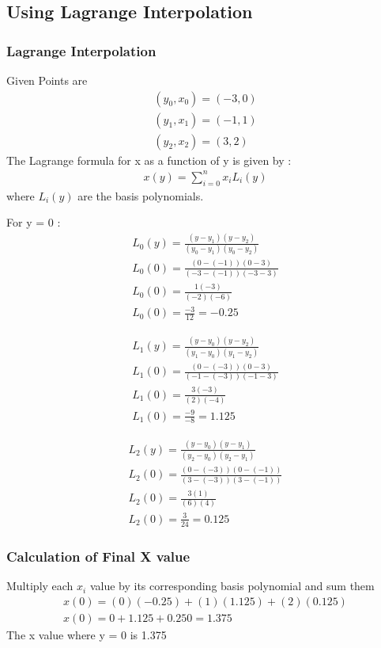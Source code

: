\documentclass{beamer}
\theoremstyle{remark}
\numberwithin{equation}{section}
\numberwithin{equation}{section}
\begin{document}
\subsection{Using Lagrange Interpolation }
\begin{frame}
\frametitle{Lagrange Interpolation}
Given Points are
\begin{align}
(y_0,x_0) = (-3,0) \\
(y_1,x_1) = (-1,1) \\
(y_2,x_2) = (3,2)
\end{align}
The Lagrange formula for x as a function of y is given by :
\begin{align}
x(y) =   \sum_{i=0}^{n}x_iL_i(y)  
\end{align}
where $L_i(y)$ are the basis polynomials. 
\end{frame}
\begin{frame}
For y = 0 :
\begin{align}
L_0(y) = \frac{(y-y_1)(y-y_2)}{(y_0-y_1)(y_0-y_2)} \\
L_0(0) = \frac{(0-(-1))(0-3)}{(-3-(-1))(-3-3)} \\
L_0(0) = \frac{1(-3)}{(-2)(-6)} \\
L_0(0) = \frac{-3}{12} = -0.25
\end{align}

\end{frame}
\begin{frame}
\begin{align}
L_1(y) = \frac{(y-y_0)(y-y_2)}{(y_1-y_0)(y_1-y_2)} \\
L_1(0) = \frac{(0-(-3))(0-3)}{(-1-(-3))(-1-3)} \\
L_1(0) = \frac{3(-3)}{(2)(-4)} \\
L_1(0) = \frac{-9}{-8} = 1.125
\end{align}

\end{frame}
\begin{frame}
\begin{align}
L_2(y) = \frac{(y-y_0)(y-y_1)}{(y_2-y_0)(y_2-y_1)} \\
L_2(0) = \frac{(0-(-3))(0-(-1))}{(3-(-3))(3-(-1))} \\
L_2(0) = \frac{3(1)}{(6)(4)} \\
L_2(0) = \frac{3}{24} = 0.125
\end{align}

\end{frame}
\begin{frame}
\frametitle{Calculation of Final X value}
Multiply each $x_i$ value by its corresponding basis polynomial and sum them 
\begin{align}
x(0) = (0)(-0.25) + (1)(1.125) + (2)(0.125) \\
x(0) = 0 + 1.125 + 0.250 = 1.375
\end{align}
The x value where y = 0 is 1.375
\end{frame}
\end{document}

